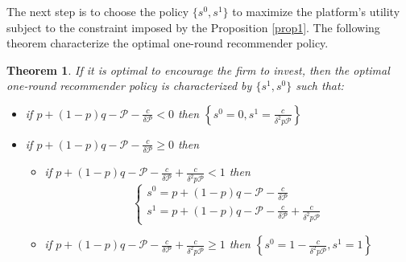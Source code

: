 \documentclass[a4paper]{article}
\newtheorem{theorem}{Theorem}
\begin{document}
The next step is to choose the policy $\{s^0, s^1\}$ to maximize the platform's utility subject to the constraint imposed by the Proposition \ref{prop1}. The following theorem characterize the optimal one-round recommender policy.
\begin{theorem} \label{th1}
	If it is optimal to encourage the firm to invest, then the optimal one-round recommender policy is characterized by $\{s^1, s^0\}$ such that:
	\begin{itemize}
		\item if $p+(1-p)q - \mathcal{P} - \frac{c}{\delta \mathcal{P}} < 0$ then $\left\{s^0 = 0, s^1 = \frac{c}{\delta^2 p \mathcal{P}} \right\}$
		\item if $p+(1-p)q - \mathcal{P} - \frac{c}{\delta \mathcal{P}} \ge 0$ then
		\begin{itemize}
			\item if $p+(1-p)q - \mathcal{P} - \frac{c}{\delta \mathcal{P}} + \frac{c}{\delta^2 p \mathcal{P}} < 1$ then $$\begin{cases}s^0 = p+(1-p)q - \mathcal{P} - \frac{c}{\delta \mathcal{P}}\\ s^1 = p+(1-p)q - \mathcal{P} - \frac{c}{\delta \mathcal{P}} + \frac{c}{\delta^2 p \mathcal{P}} \end{cases}$$
			\item if $p+(1-p)q - \mathcal{P} - \frac{c}{\delta \mathcal{P}} + \frac{c}{\delta^2 p \mathcal{P}} \ge 1$ then $\left\{s^0 = 1-\frac{c}{\delta^2 p \mathcal{P}}, s^1 =1 \right\}$
		\end{itemize}
	\end{itemize}
\end{theorem} 
\end{document}
